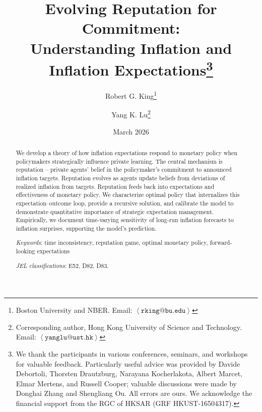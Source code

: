 \documentclass[12pt,letter,leqno]{article}
\theoremstyle{asn}
\theoremstyle{lem}
\theoremstyle{slem}
\theoremstyle{prop}
\theoremstyle{appprop}
\theoremstyle{rem}
\theoremstyle{defn}
\begin{document}
\title{\textbf{Evolving Reputation for Commitment:\\ Understanding Inflation and Inflation Expectations}\thanks{
We thank the participants in various conferences, seminars, and workshops for valuable feedback. Particularly useful advice was provided by Davide Debortoli, Thorsten Drautzburg, Narayana Kocherlakota, Albert Marcet, Elmar Mertens, and Russell Cooper; valuable discussions were made by Donghai Zhang and Shengliang Ou. All errors are ours. We acknowledge the
financial support from the RGC of HKSAR (GRF HKUST-16504317).}}
\author{Robert G. King\thanks{%
Boston University and NBER. Email: \href{mailto:rking@bu.edu}{$\left \langle%
\mathtt{rking@bu.edu}\right \rangle $}} \and Yang K. Lu\thanks{%
Corresponding author, Hong Kong University of Science and Technology. Email: 
\href{mailto:yanglu@ust.hk}{$\left \langle \mathtt{yanglu@ust.hk}%
\right
\rangle $}} }
\date{March 2026}
\maketitle

\begin{abstract}
\baselineskip15pt
  
\noindent We develop a theory of how inflation expectations respond to monetary policy when policymakers strategically influence private learning. The central mechanism is reputation -- private agents’ belief in the policymaker’s commitment to announced inflation targets. Reputation evolves as agents update beliefs from deviations of realized inflation from targets. Reputation feeds back into expectations and effectiveness of monetary policy. We characterize optimal policy that internalizes this expectation–outcome loop, provide a recursive solution, and calibrate the model to demonstrate quantitative importance of strategic expectation management. Empirically, we document time-varying sensitivity of long-run inflation forecasts to inflation surprises, supporting the model’s prediction.
\vspace{0.5em}

\vspace{0.5em} \noindent \textit{Keywords}: time inconsistency, reputation
game, optimal monetary policy, forward-looking expectations

\vspace{0.5em} \noindent \textit{JEL classifications}: E52, D82, D83.
\end{abstract}
\end{document}
